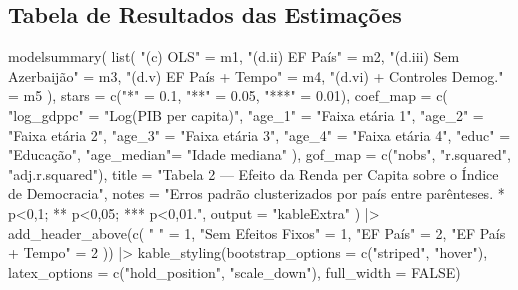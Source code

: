 \documentclass[
  portuguese,
  letterpaper,
  DIV=11,
  numbers=noendperiod]{scrartcl}
\newenvironment{Shaded}{\begin{snugshade}}{\end{snugshade}}
\newcommand{\AttributeTok}[1]{\textcolor[rgb]{0.40,0.45,0.13}{#1}}
\newcommand{\ConstantTok}[1]{\textcolor[rgb]{0.56,0.35,0.01}{#1}}
\newcommand{\DecValTok}[1]{\textcolor[rgb]{0.68,0.00,0.00}{#1}}
\newcommand{\FloatTok}[1]{\textcolor[rgb]{0.68,0.00,0.00}{#1}}
\newcommand{\FunctionTok}[1]{\textcolor[rgb]{0.28,0.35,0.67}{#1}}
\newcommand{\NormalTok}[1]{\textcolor[rgb]{0.00,0.23,0.31}{#1}}
\newcommand{\OtherTok}[1]{\textcolor[rgb]{0.00,0.23,0.31}{#1}}
\newcommand{\SpecialCharTok}[1]{\textcolor[rgb]{0.37,0.37,0.37}{#1}}
\newcommand{\StringTok}[1]{\textcolor[rgb]{0.13,0.47,0.30}{#1}}
\begin{document}
\subsection{Tabela de Resultados das
Estimações}\label{tabela-de-resultados-das-estimauxe7uxf5es}

\begin{Shaded}
\begin{Highlighting}[]
\FunctionTok{modelsummary}\NormalTok{(}
  \FunctionTok{list}\NormalTok{(}
    \StringTok{"(c) OLS"}                   \OtherTok{=}\NormalTok{ m1,}
    \StringTok{"(d.ii) EF País"}            \OtherTok{=}\NormalTok{ m2,}
    \StringTok{"(d.iii) Sem Azerbaijão"}    \OtherTok{=}\NormalTok{ m3,}
    \StringTok{"(d.v) EF País + Tempo"}     \OtherTok{=}\NormalTok{ m4,}
    \StringTok{"(d.vi) + Controles Demog."} \OtherTok{=}\NormalTok{ m5}
\NormalTok{  ),}
  \AttributeTok{stars      =} \FunctionTok{c}\NormalTok{(}\StringTok{"*"} \OtherTok{=} \FloatTok{0.1}\NormalTok{, }\StringTok{"**"} \OtherTok{=} \FloatTok{0.05}\NormalTok{, }\StringTok{"***"} \OtherTok{=} \FloatTok{0.01}\NormalTok{),}
  \AttributeTok{coef\_map   =} \FunctionTok{c}\NormalTok{(}
    \StringTok{"log\_gdppc"} \OtherTok{=} \StringTok{"Log(PIB per capita)"}\NormalTok{,}
    \StringTok{"age\_1"}     \OtherTok{=} \StringTok{"Faixa etária 1"}\NormalTok{,}
    \StringTok{"age\_2"}     \OtherTok{=} \StringTok{"Faixa etária 2"}\NormalTok{,}
    \StringTok{"age\_3"}     \OtherTok{=} \StringTok{"Faixa etária 3"}\NormalTok{,}
    \StringTok{"age\_4"}     \OtherTok{=} \StringTok{"Faixa etária 4"}\NormalTok{,}
    \StringTok{"educ"}      \OtherTok{=} \StringTok{"Educação"}\NormalTok{,}
    \StringTok{"age\_median"}\OtherTok{=} \StringTok{"Idade mediana"}
\NormalTok{  ),}
  \AttributeTok{gof\_map    =} \FunctionTok{c}\NormalTok{(}\StringTok{"nobs"}\NormalTok{, }\StringTok{"r.squared"}\NormalTok{, }\StringTok{"adj.r.squared"}\NormalTok{),}
  \AttributeTok{title      =} \StringTok{"Tabela 2 — Efeito da Renda per Capita sobre o Índice de Democracia"}\NormalTok{,}
  \AttributeTok{notes      =} \StringTok{"Erros padrão clusterizados por país entre parênteses. * p\textless{}0,1; ** p\textless{}0,05; *** p\textless{}0,01."}\NormalTok{,}
  \AttributeTok{output     =} \StringTok{"kableExtra"}
\NormalTok{) }\SpecialCharTok{|\textgreater{}}
  \FunctionTok{add\_header\_above}\NormalTok{(}\FunctionTok{c}\NormalTok{(}
    \StringTok{" "} \OtherTok{=} \DecValTok{1}\NormalTok{,}
    \StringTok{"Sem Efeitos Fixos"} \OtherTok{=} \DecValTok{1}\NormalTok{,}
    \StringTok{"EF País"} \OtherTok{=} \DecValTok{2}\NormalTok{,}
    \StringTok{"EF País + Tempo"} \OtherTok{=} \DecValTok{2}
\NormalTok{  )) }\SpecialCharTok{|\textgreater{}}
  \FunctionTok{kable\_styling}\NormalTok{(}\AttributeTok{bootstrap\_options =} \FunctionTok{c}\NormalTok{(}\StringTok{"striped"}\NormalTok{, }\StringTok{"hover"}\NormalTok{),}
                \AttributeTok{latex\_options     =} \FunctionTok{c}\NormalTok{(}\StringTok{"hold\_position"}\NormalTok{, }\StringTok{"scale\_down"}\NormalTok{),}
                \AttributeTok{full\_width        =} \ConstantTok{FALSE}\NormalTok{)}
\end{Highlighting}
\end{Shaded}
\end{document}

